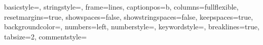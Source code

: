 \usepackage{color}
\usepackage{accsupp}
\usepackage{hyperref}
\usepackage[ngerman]{babel}
\usepackage[utf8]{inputenc}
\usepackage[T1]{fontenc}

\usepackage{listings}
{
  basicstyle=\ttfamily, %
  stringstyle=\color{green}\ttfamily,
  frame=lines, %
  captionpos=b,
  columns=fullflexible, %
  resetmargins=true,
  showspaces=false, %
  showstringspaces=false, %
  keepspaces=true, %
  backgroundcolor=\color{bisque}, %
  numbers=left, %
  numberstyle=\noncopynumber, %
  keywordstyle=\color{blue}, %
  breaklines=true,
  tabsize=2,
  commentstyle=\color{brown}
}
\newcommand{\noncopynumber}[1]{%
    \BeginAccSupp{method=escape,ActualText={}}%
    #1%
    \EndAccSupp{}%
}


